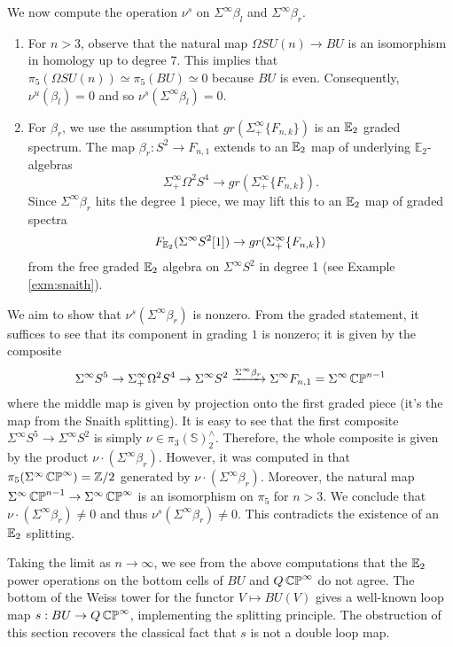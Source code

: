We now compute the operation $\nu^s$ on $\Sigma^{\infty} \beta_l$ and $\Sigma^{\infty} \beta_r$.  
\begin{enumerate}
\item For $n>3$, observe that the natural map $\Omega SU(n) \to BU$ is an isomorphism in homology up to degree $7$.  This implies that $\pi_5(\Omega SU(n)) \simeq \pi_5(BU) \simeq 0$ because $BU$ is even.  Consequently, $\nu^u(\beta_l) = 0$ and so $\nu^s(\Sigma^{\infty} \beta_l) = 0.$  

\item For $\beta_r$, we use the assumption that $gr(\Sigma^{\infty}_+ \{ F_{n,k} \})$ is an $\operatorname{\mathbb{E}}_2$ graded spectrum.  The map $\beta_r: S^2 \to F_{n,1}$ extends to an $\operatorname{\mathbb{E}}_2$ map of underlying $\mathbb{E}_2$-algebras $$\Sigma^{\infty}_+ \Omega^2 S^4 \to  gr(\Sigma^{\infty}_+ \{ F_{n,k} \}).$$  Since $\Sigma^{\infty} \beta_r$ hits the degree 1 piece, we may lift this to an $\operatorname{\mathbb{E}}_2$ map of graded spectra $$F_{\operatorname{\mathbb{E}}_2}(\Sigma^\infty S^2[1]) \to gr(\Sigma^{\infty}_+ \{ F_{n,k} \})$$ from the free graded $\operatorname{\mathbb{E}}_2$ algebra on $\Sigma^{\infty} S^2$ in degree 1 (see Example \ref{exm:snaith}).
\end{enumerate}

We aim to show that $\nu^s(\Sigma^\infty \beta_r)$ is nonzero.  From the graded statement, it suffices to see that its component in grading $1$ is nonzero; it is given by the composite $$\Sigma^{\infty} S^5 \to \Sigma^{\infty}_+ \Omega^2 S^4 \to \Sigma^{\infty} S^2 \xrightarrow{\Sigma^{\infty} \beta_r} \Sigma^{\infty} F_{n,1} =\Sigma^{\infty} \operatorname{\mathbb{CP}}^{n-1}$$ where the middle map is given by projection onto the first graded piece (it's the map from the Snaith splitting).  It is easy to see that the first composite $\Sigma^{\infty} S^5 \to \Sigma^{\infty} S^2$ is simply $\nu \in \pi_3(\mathbb{S})^{\wedge}_2.$  Therefore, the whole composite is given by the product $\nu\cdot (\Sigma^{\infty} \beta_r).$  
However, it was computed in \cite[Theorem II.8]{Liulevicius} that $\pi_5(\Sigma^{\infty}\operatorname{\mathbb{CP}}^{\infty})=\mathbb{Z}/2$ generated by $\nu \cdot (\Sigma^{\infty}\beta_r).$  Moreover, the natural map $\Sigma^{\infty}\operatorname{\mathbb{CP}}^{n-1} \to \Sigma^{\infty}\operatorname{\mathbb{CP}}^\infty$ is an isomorphism on $\pi_5$ for $n>3$.  We conclude that $\nu \cdot (\Sigma^{\infty}\beta_r )\neq 0$ and thus $\nu^s(\Sigma^{\infty} \beta_r) \neq 0$.  This contradicts the existence of an $\operatorname{\mathbb{E}}_2$ splitting.   


\begin{rmk}
Taking the limit as $n\to\infty$, we see from the above computations that the $\operatorname{\mathbb{E}}_2$ power operations on the bottom cells of $BU$ and $Q\operatorname{\mathbb{CP}}^{\infty}$ do not agree.  The bottom of the Weiss tower for the functor $V \mapsto BU(V)$ gives a well-known loop map $s:BU \to Q\operatorname{\mathbb{CP}}^{\infty}$, implementing the splitting principle.  The obstruction of this section recovers the classical fact that $s$ is not a double loop map.
\end{rmk}

